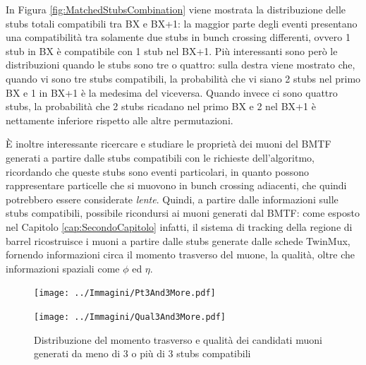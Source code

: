 In Figura \ref{fig:MatchedStubsCombination} viene mostrata la distribuzione delle stubs totali compatibili tra BX e BX+1: la maggior parte degli eventi presentano una compatibilità tra solamente due stubs in bunch crossing differenti, ovvero 1 stub in BX è compatibile con 1 stub nel BX+1. Più interessanti sono però le distribuzioni quando le stubs sono tre o quattro: sulla destra viene mostrato che, quando vi sono tre stubs compatibili, la probabilità che vi siano 2 stubs nel primo BX e 1 in BX+1 è la medesima del viceversa. Quando invece ci sono quattro stubs, la probabilità che 2 stubs ricadano nel primo BX e 2 nel BX+1 è nettamente inferiore rispetto alle altre permutazioni. 

È inoltre interessante ricercare e studiare le proprietà dei muoni del BMTF generati a partire dalle stubs compatibili con le richieste dell'algoritmo, ricordando che queste stubs sono eventi particolari, in quanto possono rappresentare particelle che si muovono in bunch crossing adiacenti, che quindi potrebbero essere considerate \textit{lente}.\newline
Quindi, a partire dalle informazioni sulle stubs compatibili, possibile ricondursi ai muoni generati dal BMTF: come esposto nel Capitolo \ref{cap:SecondoCapitolo} infatti, il sistema di tracking della regione di barrel ricostruisce i muoni a partire dalle stubs generate dalle schede TwinMux, fornendo informazioni circa il momento trasverso del muone, la qualità, oltre che informazioni spaziali come $\phi$ ed $\eta$. 







\begin{figure}[t]
  \centering
  \begin{minipage}[b]{0.48\textwidth}
    \centering
    \texttt{[image: ../Immagini/Pt3And3More.pdf]} 
    \end{minipage}
    \hfill 
    \begin{minipage}[b]{0.48\textwidth}
      \centering
      \texttt{[image: ../Immagini/Qual3And3More.pdf]} 
    \end{minipage}
    \caption{Distribuzione del momento trasverso e qualità dei candidati muoni generati da meno di 3 o più di 3 stubs compatibili}
  \label{fig:PtQual3And3More}
\end{figure}
